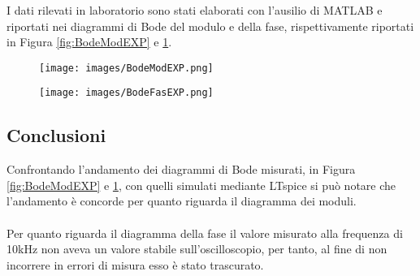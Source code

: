 I dati rilevati in laboratorio sono stati elaborati con l'ausilio di MATLAB\textregistered\xspace e riportati nei diagrammi di Bode del modulo e della fase, rispettivamente riportati in Figura \ref{fig:BodeModEXP} e \ref{fig:BodeFasEXP}.
\begin{figure}[H]
    \centering
    \begin{minipage}{.5\textwidth}
      \centering
      \texttt{[image: images/BodeModEXP.png]}
      \label{fig:BodeModEXP}
    \end{minipage}%
    \begin{minipage}{.5\textwidth}
      \centering
      \texttt{[image: images/BodeFasEXP.png]}
      \label{fig:BodeFasEXP}
    \end{minipage}
\end{figure}
\begin{comment}
\begin{figure}[H]
   \centering
    \texttt{[image: images/BodeModEXP.png]}
    \caption{Diagramma di Bode del modulo}
    \label{fig:BodeModEXP}
\end{figure}
\begin{figure}[H]
    \centering
    \texttt{[image: images/BodeFasEXP.png]}
    \caption{Diagramma di Bode delle fasi}
    \label{fig:BodeFasEXP}
\end{figure}
\end{comment}
\subsection{Conclusioni}
Confrontando l'andamento dei diagrammi di Bode misurati, in Figura \ref{fig:BodeModEXP} e \ref{fig:BodeFasEXP}, con quelli simulati mediante LTspice \textregistered\xspace si può notare che l'andamento è concorde per quanto riguarda il diagramma dei moduli.\\\\
Per quanto riguarda il diagramma della fase il valore misurato alla frequenza di 10kHz non aveva un valore stabile sull'oscilloscopio, per tanto, al fine di non incorrere in errori di misura esso è stato trascurato.